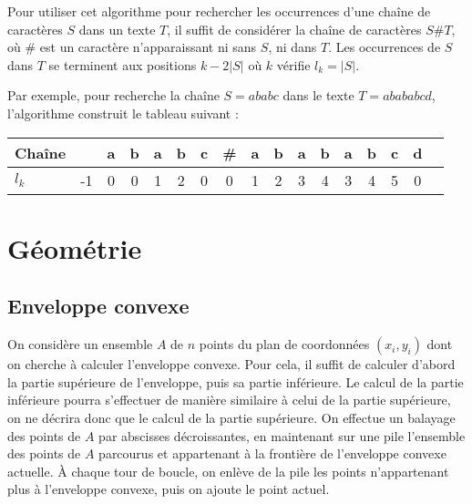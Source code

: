 \documentclass[11pt,a4paper]{article}
\begin{document}
Pour utiliser cet algorithme pour rechercher les occurrences d'une chaîne de caractères \(S\) dans un texte \(T\), il suffit de considérer la chaîne de caractères \(S \# T\), où \(\#\) est un caractère n'apparaissant ni sans \(S\), ni dans \(T\). Les occurrences de \(S\) dans \(T\) se terminent aux positions \(k - 2|S|\) où \(k\) vérifie \(l_k = |S|\).

Par exemple, pour recherche la chaîne \(S=ababc\) dans le texte \(T=abababcd\), l'algorithme construit le tableau suivant :
\begin{center}
  \begin{tabular}{|l |c|c|c|c|c|c|c|c|c|c|c|c|c|c|c|c|}
    \hline
    Chaîne &&
    \cellcolor{red!30}a &
    \cellcolor{green!30}b &
    \cellcolor{red!30}a &
    \cellcolor{green!30}b &
    \cellcolor{blue!30}c &
    \# &
    \cellcolor{red!30}a &
    \cellcolor{green!30}b &
    \cellcolor{red!30}a &
    \cellcolor{green!30}b &
    \cellcolor{red!30}a &
    \cellcolor{green!30}b &
    \cellcolor{blue!30}c &
    \cellcolor{yellow!40}d \\

    \hline
    \(l_k\) &
    -1 & 0 & 0 & 1 & 2 & 0 & 0 & 1 & 2 & 3 & 4 & 3 & 4 & 5 & 0 \\
    \hline
  \end{tabular}
\end{center}

  \section{Géométrie}

    \subsection{Enveloppe convexe}

On considère un ensemble \(A\) de \(n\) points du plan de coordonnées \((x_i,y_i)\) dont on cherche à calculer l'enveloppe convexe. Pour cela, il suffit de calculer d'abord la partie supérieure de l'enveloppe, puis sa partie inférieure. Le calcul de la partie inférieure pourra s'effectuer de manière similaire à celui de la partie supérieure, on ne décrira donc que le calcul de la partie supérieure. On effectue un balayage des points de \(A\) par abscisses décroissantes, en maintenant sur une pile l'ensemble des points de \(A\) parcourus et appartenant à la frontière de l'enveloppe convexe actuelle. À chaque tour de boucle, on enlève de la pile les points n'appartenant plus à l'enveloppe convexe, puis on ajoute le point actuel.
\end{document}

